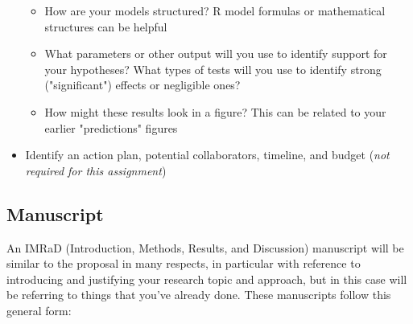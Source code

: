 \documentclass[11pt]{article}
\begin{document}
\begin{itemize}
\begin{itemize}
\begin{itemize}
    \end{itemize}
    \item How are your models structured? R model formulas or mathematical structures can be helpful
    \item What parameters or other output will you use to identify support for your hypotheses? What types of tests will you use to identify strong ("significant") effects or negligible ones?
    \item How might these results look in a figure? This can be related to your earlier "predictions" figures
  \end{itemize}
  \item Identify an action plan, potential collaborators, timeline, and budget (\emph{not required for this assignment})
\end{itemize}

\subsection*{Manuscript}

An IMRaD (Introduction, Methods, Results, and Discussion) manuscript will be similar to the proposal in many respects, in particular with reference to introducing and justifying your research topic and approach, but in this case will be referring to things that you've already done. These manuscripts follow this general form:
\end{document}
